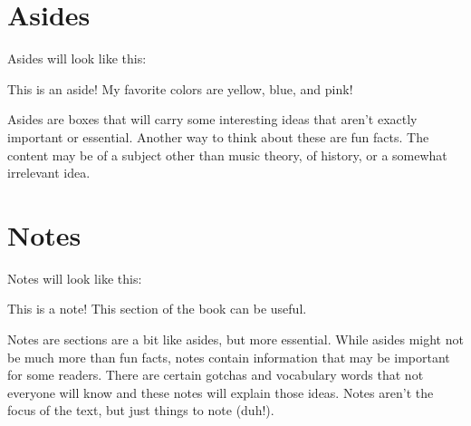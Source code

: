 \documentclass[../OpenAppliedMusicTheory.tex]{subfiles}
\begin{document}
    \section{Asides}\label{ch0:asides}
    Asides will look like this:
    \begin{aside}{This is an aside!}
        My favorite colors are yellow, blue, and pink!
    \end{aside}
    Asides are boxes that will carry some interesting ideas that aren't exactly important or essential. Another way to think about these are fun facts. The content may be of a subject other than music theory, of history, or a somewhat irrelevant idea.

    \section{Notes}\label{ch0:notes}
    Notes will look like this:
    \begin{note}{This is a note!}
        This section of the book can be useful.
    \end{note}
    Notes are sections are a bit like asides, but more essential. While asides might not be much more than fun facts, notes contain information that may be important for some readers. There are certain gotchas and vocabulary words that not everyone will know and these notes will explain those ideas. Notes aren't the focus of the text, but just things to note (duh!).
\end{document}
